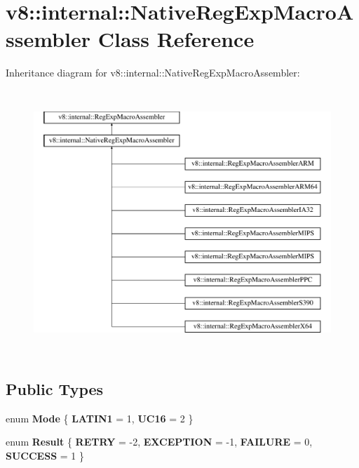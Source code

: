 \hypertarget{classv8_1_1internal_1_1NativeRegExpMacroAssembler}{}\section{v8\+:\+:internal\+:\+:Native\+Reg\+Exp\+Macro\+Assembler Class Reference}
\label{classv8_1_1internal_1_1NativeRegExpMacroAssembler}
Inheritance diagram for v8\+:\+:internal\+:\+:Native\+Reg\+Exp\+Macro\+Assembler\+:\begin{figure}[H]
\begin{center}
\leavevmode
\includegraphics[height=10.000000cm]{classv8_1_1internal_1_1NativeRegExpMacroAssembler}
\end{center}
\end{figure}
\subsection*{Public Types}
\begin{DoxyCompactItemize}
\item 
\mbox{\label{classv8_1_1internal_1_1NativeRegExpMacroAssembler_a0d5534efccb56e5c02e89be0081f406a}} 
enum {\bfseries Mode} \{ {\bfseries L\+A\+T\+I\+N1} = 1, 
{\bfseries U\+C16} = 2
 \}
\item 
\mbox{\label{classv8_1_1internal_1_1NativeRegExpMacroAssembler_a454f330d24fa368c4ea0ff628f1d28f1}} 
enum {\bfseries Result} \{ {\bfseries R\+E\+T\+RY} = -\/2, 
{\bfseries E\+X\+C\+E\+P\+T\+I\+ON} = -\/1, 
{\bfseries F\+A\+I\+L\+U\+RE} = 0, 
{\bfseries S\+U\+C\+C\+E\+SS} = 1
 \}
\end{DoxyCompactItemize}
